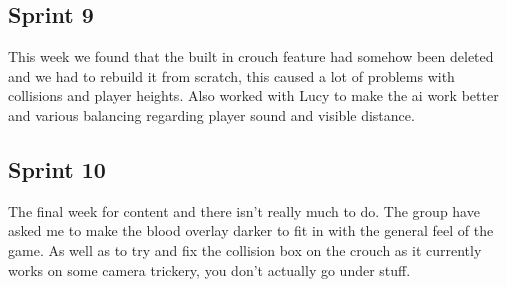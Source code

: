 \documentclass{scrartcl}
\begin{document}
\subsection*{Sprint 9}

This week we found that the built in crouch feature had somehow been deleted and we had to rebuild it from scratch, this caused a lot of problems with collisions and player heights. Also worked with Lucy to make the ai work better and various balancing regarding player sound and visible distance.

\subsection*{Sprint 10}

The final week for content and there isn't really much to do. The group have asked me to make the blood overlay darker to fit in with the general feel of the game. As well as to try and fix the collision box on the crouch as it currently works on some camera trickery, you don't actually go under stuff.
\end{document}
